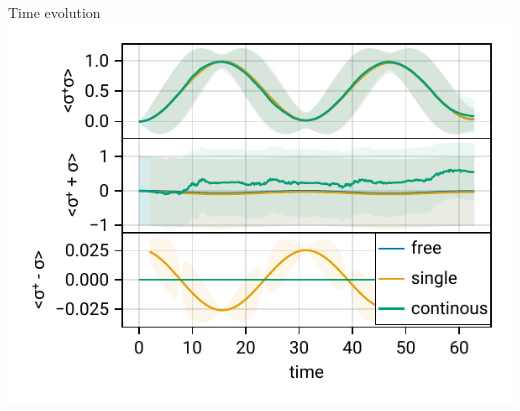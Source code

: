 \documentclass[
]{beamer}
\begin{document}
\begin{frame}{Time evolution}
	\includegraphics{figures/02 rabi w measurement.pdf}
\end{frame}


{
	\begin{frame}[plain]{}\end{frame}
}
\end{document}
